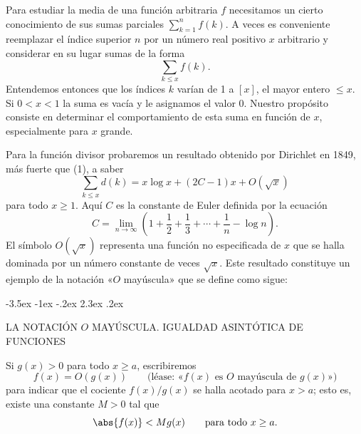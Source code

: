 \documentclass[12pt,a4paper]{book}
\makeatletter
\renewcommand\section{\@startsection{section}{1}{\z@}%
  {-3.5ex \@plus -1ex \@minus -.2ex}%
  {2.3ex \@plus .2ex}%
  {\normalfont\Large\bfseries\raggedright}}
\makeatother
\begin{document}
    Para estudiar la media de una función arbitraria $f$ necesitamos un cierto conocimiento
    de sus sumas parciales $\sum_{k=1}^{n}f(k)$. A veces es conveniente reemplazar el
    índice superior $n$ por un número real positivo $x$ arbitrario y considerar en su
    lugar sumas de la forma
    \begin{equation*}
        \sum_{k\leq x}f(k).
    \end{equation*}
    Entendemos entonces que los índices $k$ varían de 1 a $[x]$, el mayor entero $\leq x$.
    Si $0<x<1$ la suma es vacía y le asignamos el valor 0. Nuestro propósito consiste en
    determinar el comportamiento de esta suma en función de $x$, especialmente para $x$
    grande.

    Para la función divisor probaremos un resultado obtenido por Dirichlet en 1849, más
    fuerte que (1), a saber
    \begin{equation}
        \sum_{k\leq x}d(k)=x\log x+(2C-1)x+O(\sqrt{x})
    \end{equation}
    para todo $x\geq1$. Aquí $C$ es la constante de Euler definida por la ecuación\label{sim:C}
    \begin{equation}
        C=\lim_{n\to\infty}\left(1+\frac{1}{2}+\frac{1}{3}+\cdots+\frac{1}{n}-\log n\right).
    \end{equation}
    El símbolo $O(\sqrt{x})$ representa una función no especificada de $x$ que se halla
    dominada por un número constante de veces $\sqrt{x}$. Este resultado constituye un
    ejemplo de la notación «$O$ mayúscula» que se define como sigue:

    \section{LA NOTACIÓN \texorpdfstring{$O$}{O} MAYÚSCULA. IGUALDAD ASINTÓTICA DE FUNCIONES}\label{sim:O}\label{sim:sim}
    \begin{definicion}[O mayúscula]
        Si $g(x)>0$ para todo $x\geq a$, escribiremos
        \begin{equation*}
            f(x)=O(g(x))\qquad\text{(léase: «$f(x)$ es $O$ mayúscula de $g(x)$»)}
        \end{equation*}
        para indicar que el cociente $f(x)/g(x)$ se halla acotado para $x>a$; esto es,
        existe una constante $M>0$ tal que
        \begin{equation*}
            \abs{f(x)}<Mg(x)\qquad\text{para todo } x\geq a.
        \end{equation*}
    \end{definicion}
\end{document}
